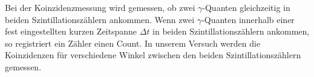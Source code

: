 Bei der Koinzidenzmessung wird gemessen, ob zwei $\gamma$-Quanten gleichzeitig in beiden Szintillationszählern ankommen. Wenn zwei $\gamma$-Quanten innerhalb einer fest eingestellten kurzen Zeitspanne $\Delta t$ in beiden Szintillationszählern ankommen, so registriert ein Zähler einen Count. In unserem Versuch werden die Koinzidenzen für verschiedene Winkel zwischen den beiden Szintillationszählern gemessen.

















